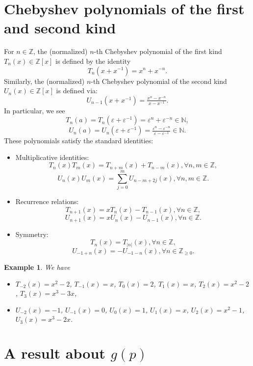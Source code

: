 \documentclass[11pt, a4paper]{amsart}
\newcommand{\ep}{\varepsilon}
\newcommand{\eq}[1]{\begin{equation}#1\end{equation}}
\theoremstyle{plain}
\newtheorem{example}{Example}[section]
\numberwithin{equation}{section}
\begin{document}
\section{Chebyshev polynomials of the first and second kind}
\noindent 
For $n \in \mathbb Z$, the (normalized) $n$-th Chebyshev polynomial of the first kind $T_n(x) \in \mathbb Z[x]$ is defined by the identity \eq{T_n(x+x^{-1}) = x^n+x^{-n}.} Similarly, the (normalized) $n$-th Chebyshev polynomial of the second kind  $U_n(x) \in \mathbb Z[x]$ is defined via: \eq{U_{n-1}(x+x^{-1}) = \tfrac{x^n-x^{-n}}{x-x^{-1}}.}
In particular, we see \eq{T_n(a) = T_n(\ep+\ep^{-1})=\ep^n +\ep^{-n} \in \mathbb N,} \eq{U_n(a) = U_n(\ep+\ep^{-1}) =\tfrac{\ep^{n}-\ep^{-n}}{\ep-\ep^{-1}}\in \mathbb N.}
These polynomials satisfy the standard identities:
\begin{itemize}
\item Multiplicative identities:
\eq{\label{ChebRelations}T_n(x)T_m(x) = T_{n+m}(x) + T_{n-m}(x), \forall n,m \in \mathbb Z , }
\eq{\label{Urecursion}U_n(x)U_m(x) = \sum_{j=0}^m U_{n-m+2j}(x), \forall n,m \in \mathbb Z .} 
\item Recurrence relations:
\eq{T_{n+1}(x) = x T_n(x) - T_{n-1}(x), \forall n \in \mathbb Z,}
\eq{U_{n+1}(x) = x U_{n}(x)-U_{n-1}(x), \forall n\in \mathbb Z.}
\item Symmetry:
\eq{T_n(x) = T_{|n|}(x), \forall n\in \mathbb Z,}
\eq{U_{-1 + n}(x) = -U_{-1-n}(x), \forall n\in \mathbb Z_{\geq 0}.}
\end{itemize}
\begin{example}
We have
\begin{itemize}
\item[] $T_{-2}(x) = x^2-2$, $T_{-1}(x)=x$, $T_0(x) = 2$, $T_1(x)=x$, $T_2(x) = x^2-2$, $T_3(x) = x^3-3x$,
\item[] $U_{-2}(x) = -1$, $U_{-1}(x) = 0$, $U_0(x) = 1$, $U_1(x) = x$, $U_2(x) = x^2-1$, $U_3(x) = x^3-2x$.
\end{itemize}
\end{example}

\section{A result about $g(p)$}
\end{document}
